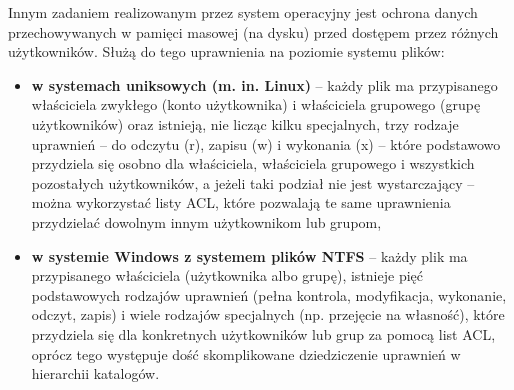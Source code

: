 Innym zadaniem realizowanym przez system operacyjny jest ochrona danych przechowywanych w pamięci masowej (na dysku) przed dostępem przez różnych użytkowników. Służą do tego uprawnienia na poziomie systemu plików:
\begin{itemize}
	\item  \textbf{w systemach uniksowych (m. in. Linux)} – każdy plik ma przypisanego właściciela zwykłego (konto użytkownika) i właściciela grupowego (grupę użytkowników) oraz istnieją, nie licząc kilku specjalnych, trzy rodzaje uprawnień – do odczytu (r), zapisu (w) i wykonania (x) – które podstawowo przydziela się osobno dla właściciela, właściciela grupowego i wszystkich pozostałych użytkowników, a jeżeli taki podział nie jest wystarczający – można wykorzystać listy ACL, które pozwalają te same uprawnienia przydzielać dowolnym innym użytkownikom lub grupom,
	\item  \textbf{w systemie Windows z systemem plików NTFS} – każdy plik ma przypisanego właściciela (użytkownika albo grupę), istnieje pięć podstawowych rodzajów uprawnień (pełna kontrola, modyfikacja, wykonanie, odczyt, zapis) i wiele rodzajów specjalnych (np. przejęcie na własność), które przydziela się dla konkretnych użytkowników lub grup za pomocą list ACL, oprócz tego występuje dość skomplikowane dziedziczenie uprawnień w hierarchii katalogów.
\end{itemize}
